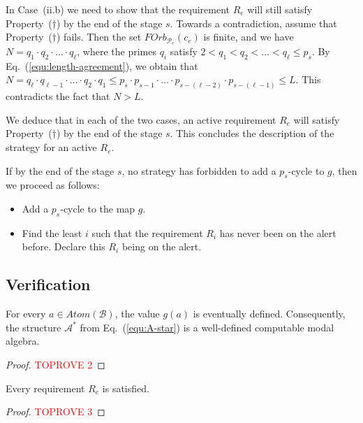 \documentclass[a4paper,UKenglish,cleveref, autoref, thm-restate]{lipics-v2021}
\begin{document}
In Case~(ii.b) we need to show that the requirement $R_e$ will still satisfy Property~($\dagger$) by the end of the stage $s$. Towards a contradiction, assume that Property~($\dagger$) fails. Then the set $FOrb_{\mathcal{P}_e}(c_e)$ is finite, and we have $N = q_1 \cdot q_2\cdot \ldots \cdot q_{\ell}$, where the primes $q_i$ satisfy $2 < q_1 < q_2 <\dots <q_\ell \leq p_s$. By Eq.~(\ref{equ:length-agreement}), we obtain that
$
	N = q_{\ell} \cdot q_{\ell-1} \cdot \ldots \cdot  q_2\cdot q_1 \leq p_s \cdot p_{s-1} \cdot \ldots \cdot p_{s-(\ell-2)} \cdot p_{s-(\ell-1)} \leq L.
$
This contradicts the fact that $N > L$. 

We deduce that in each of the two cases, an active requirement $R_e$ will satisfy Property~($\dagger$) by the end of the stage $s$. This concludes the description of the strategy for an active $R_e$.



If by the end of the stage $s$, no strategy has forbidden to add a $p_s$-cycle to $g$, then we proceed as follows:
\begin{itemize}
	\item Add a $p_s$-cycle to the map $g$.
	
	\item Find the least $i$ such that the requirement $R_i$ has never been on the alert before. Declare this $R_i$ being on the alert.
\end{itemize}






\subsection{Verification}

\begin{lemma}\label{lem:01-totality}
	For every $a\in Atom(\mathcal{B})$, the value $g(a)$ is eventually defined. Consequently, the structure $\mathcal{A}^{\ast}$ from Eq.~(\ref{equ:A-star}) is a well-defined computable modal algebra.
\end{lemma}
\begin{proof}\textcolor{red}{TOPROVE 2}\end{proof}



\begin{lemma}\label{lem:02-reqs-satisfied}
	Every requirement $R_e$ is satisfied.
\end{lemma}
\begin{proof}\textcolor{red}{TOPROVE 3}\end{proof}
\end{document}
